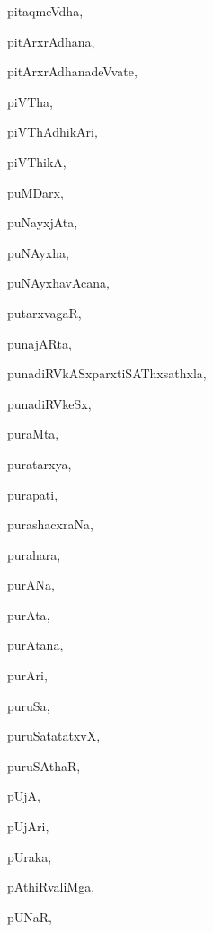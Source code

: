 \begin{multicols}{3}
{\noindent
{pitaqmeVdha}, \pageref{pitaqmeVdha}

\noindent
{pitArxrAdhana}, \pageref{pitArxrAdhana}

\noindent
{pitArxrAdhanadeVvate}, \pageref{pitArxrAdhanadeVvate}

\noindent
{piVTha}, \pageref{piVTha}

\noindent
{piVThAdhikAri}, \pageref{piVThAdhikAri}

\noindent
{piVThikA}, \pageref{piVThikA}

\noindent
{puMDarx}, \pageref{puMDarx}

\noindent
{puNayxjAta}, \pageref{puNayxjAta}

\noindent
{puNAyxha}, \pageref{puNAyxha}

\noindent
{puNAyxhavAcana}, \pageref{puNAyxhavAcana}

\noindent
{putarxvagaR}, \pageref{putarxvagaR}

\noindent
{punajARta}, \pageref{punajARta}

\noindent
{punadiRVkASxparxtiSAThxsathxla}, \pageref{punadiRVkASxparxtiSAThxsathxla}

\noindent
{punadiRVkeSx}, \pageref{punadiRVkeSx}

\noindent
{puraMta}, \pageref{puraMta}

\noindent
{puratarxya}, \pageref{puratarxya}

\noindent
{purapati}, \pageref{purapati}

\noindent
{purashacxraNa}, \pageref{purashacxraNa}

\noindent
{purahara}, \pageref{purahara}

\noindent
{purANa}, \pageref{purANa}

\noindent
{purAta}, \pageref{purAta}

\noindent
{purAtana}, \pageref{purAtana}

\noindent
{purAri}, \pageref{purAri}

\noindent
{puruSa}, \pageref{puruSa}

\noindent
{puruSatatatxvX}, \pageref{puruSatatatxvX}

\noindent
{puruSAthaR}, \pageref{puruSAthaR}

\noindent
{pUjA}, \pageref{pUjA}

\noindent
{pUjAri}, \pageref{pUjAri}

\noindent
{pUraka}, \pageref{pUraka}

\noindent
{pAthiRvaliMga}, \pageref{pAthiRvaliMga}

\noindent
{pUNaR}, \pageref{pUNaR}

}
\end{multicols}
